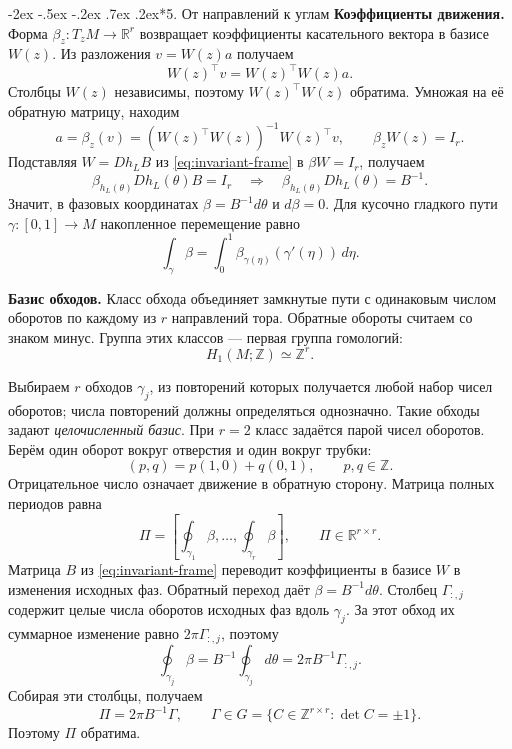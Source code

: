 \documentclass[11pt,a4paper]{article}
\makeatletter
\renewcommand\section{\@startsection{section}{1}{\z@}%
  {-2ex \@plus -.5ex \@minus -.2ex}%
  {.7ex \@plus .2ex}{\normalfont\Large\bfseries}}
\makeatother
\begin{document}
\section*{5. От направлений к углам}
\textbf{Коэффициенты движения.}
Форма $\beta_z:T_zM\to\mathbb R^r$ возвращает коэффициенты касательного вектора
в базисе $W(z)$. Из разложения $v=W(z)a$ получаем
$$
W(z)^\top v=W(z)^\top W(z)a.
$$
Столбцы $W(z)$ независимы, поэтому $W(z)^\top W(z)$ обратима.
Умножая на её обратную матрицу, находим
\begin{equation}
a=\beta_z(v)=(W(z)^\top W(z))^{-1}W(z)^\top v,
\qquad \beta_zW(z)=I_r.
\label{eq:dual-form}
\end{equation}
Подставляя $W=Dh_LB$ из \eqref{eq:invariant-frame} в $\beta W=I_r$, получаем
$$
\beta_{h_L(\theta)}Dh_L(\theta)B=I_r
\quad\Longrightarrow\quad
\beta_{h_L(\theta)}Dh_L(\theta)=B^{-1}.
$$
Значит, в фазовых координатах $\beta=B^{-1}d\theta$ и $d\beta=0$.
Для кусочно гладкого пути $\gamma:[0,1]\to M$ накопленное перемещение равно
$$
\int_\gamma\beta=\int_0^1\beta_{\gamma(\eta)}(\gamma'(\eta))\,d\eta.
$$
\begin{samepage}
\textbf{Базис обходов.}
Класс обхода объединяет замкнутые пути с одинаковым числом оборотов
по каждому из $r$ направлений тора. Обратные обороты считаем со знаком минус.
Группа этих классов --- первая группа гомологий:
$$
H_1(M;\mathbb Z)\simeq\mathbb Z^r.
$$
\end{samepage}
Выбираем $r$ обходов $\gamma_j$, из повторений которых получается любой
набор чисел оборотов; числа повторений должны определяться однозначно.
Такие обходы задают \emph{целочисленный базис}.
При $r=2$ класс задаётся парой чисел оборотов. Берём один оборот вокруг
отверстия и один вокруг трубки:
$$
(p,q)=p(1,0)+q(0,1),\qquad p,q\in\mathbb Z.
$$
Отрицательное число означает движение в обратную сторону.
Матрица полных периодов равна
\begin{equation}
\Pi=\left[\oint_{\gamma_1}\beta,\ldots,\oint_{\gamma_r}\beta\right],
\qquad \Pi\in\mathbb R^{r\times r}.
\label{eq:period-matrix}
\end{equation}
Матрица $B$ из \eqref{eq:invariant-frame} переводит коэффициенты в базисе $W$
в изменения исходных фаз. Обратный переход даёт $\beta=B^{-1}d\theta$.
Столбец $\Gamma_{:,j}$ содержит целые числа оборотов исходных фаз вдоль $\gamma_j$.
За этот обход их суммарное изменение равно $2\pi\Gamma_{:,j}$, поэтому
$$
\oint_{\gamma_j}\beta
=B^{-1}\oint_{\gamma_j}d\theta
=2\pi B^{-1}\Gamma_{:,j}.
$$
Собирая эти столбцы, получаем
\begin{equation}
\Pi=2\pi B^{-1}\Gamma,\qquad
\Gamma\in G
=\{C\in\mathbb Z^{r\times r}:\det C=\pm1\}.
\label{eq:period-frame}
\end{equation}
Поэтому $\Pi$ обратима.
\end{document}
